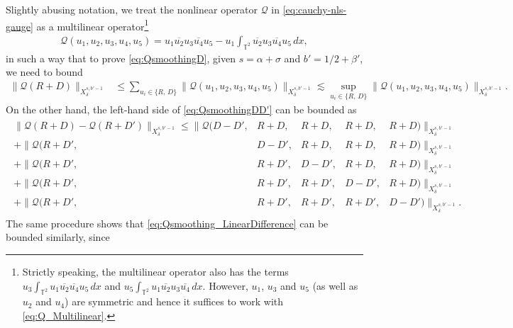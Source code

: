 \documentclass[11pt, xcolor = dvipsnames,reqno
]{amsart}
\theoremstyle{definition}
\theoremstyle{remark}
\begin{document}
Slightly abusing notation, we treat the nonlinear operator $\mathcal Q$ in \eqref{eq:cauchy-nls-gauge} as a multilinear operator\footnote{Strictly speaking, the multilinear operator also has the terms $u_3 \int_{\mathbb T^2} u_1 \overline{u_2}  \overline{u_4} u_5 \, dx$ and $u_5 \int_{\mathbb T^2}  u_1 \overline{u_2} u_3 \overline{u_4} \, dx$. However, $u_1$, $u_3$ and $u_5$ (as well as $u_2$ and $u_4$) are symmetric and hence it suffices to work with \eqref{eq:Q_Multilinear}.}
\begin{align}\label{eq:Q_Multilinear}
    \mathcal{Q}(u_1, u_2, u_3, u_4, u_5)
    = u_1 \overline{u_2} u_3 \overline{u_4} u_5 - u_1 \int_{\mathbb T^2} \overline{u_2} u_3 \overline{u_4} u_5 \, dx, 
\end{align}
in such a way that to prove \eqref{eq:QsmoothingD}, given $s = \alpha + \sigma$ and $b' = 1/2 + \beta'$, we need to bound 
\begin{align}\label{eq:decomp-symm-ui}
    \|\mathcal{Q}(R + D)\|_{X^{s,b'-1}_{\delta}} 
    & \leq  \sum_{u_i \in \{R, \,  D\}} \|\mathcal{Q}(u_1, u_2, u_3, u_4, u_5)\|_{X^{s,b'-1}_{\delta}} 
    \lesssim \sup_{u_i \in \{R, \,  D\} } \|\mathcal{Q}(u_1, u_2, u_3, u_4, u_5)\|_{X^{s,b'-1}_{\delta}}. 
\end{align} 
On the other hand, the left-hand side of \eqref{eq:QsmoothingDD'} can be bounded as
\begin{align}\label{eq:diff-ineqsDD'}
    \begin{array}{rrrrrrrr}
        \| \mathcal{Q}(R + D) - \mathcal{Q}(R + D') \|_{X^{s,b'-1}_{\delta}}
        \leq \big\| \mathcal{Q}( D - D',  & R + D, &  R + D, & R + D, & R + D) \big\|_{X^{s,b'-1}_{\delta}}  \\
        + \big\| \mathcal{Q}( R + D', & D - D', & R + D, & R + D, & R + D) \big\|_{X^{s,b'-1}_{\delta}}  \\ 
        + \big\| \mathcal{Q}( R + D', & R + D', & D - D', & R + D, & R + D) \big\|_{X^{s,b'-1}_{\delta}}  \\ 
        + \big\| \mathcal{Q}( R + D', & R + D', & R + D', & D - D', & R + D) \big\|_{X^{s,b'-1}_{\delta}}  \\
        + \big\| \mathcal{Q}( R + D', & R + D', & R + D', & R + D', & D - D') \big\|_{X^{s,b'-1}_{\delta}}.
    \end{array}
\end{align}
The same procedure shows that \eqref{eq:Qsmoothing_LinearDifference} can be bounded similarly, since 
\end{document}
